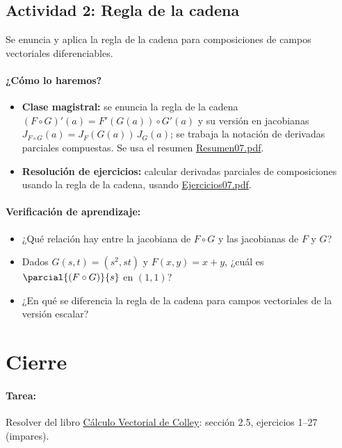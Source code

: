\documentclass[a4,11pt]{aleph-notas}
\begin{document}
\subsection*{Actividad 2: Regla de la cadena}
Se enuncia y aplica la regla de la cadena para composiciones de campos vectoriales diferenciables.

\paragraph{¿Cómo lo haremos?}
\begin{itemize}[leftmargin=*]
    \item \textbf{Clase magistral:} se enuncia la regla de la cadena $(F\circ G)'(a)=F'(G(a))\circ G'(a)$ y su versión en jacobianas $J_{F\circ G}(a)=J_F(G(a))\,J_G(a)$; se trabaja la notación de derivadas parciales compuestas. Se usa el resumen \href{https://andres-merino.github.io/MatematicaIII-05-N0051/01Resumen/Resumen07.pdf}{Resumen07.pdf}.
    \item \textbf{Resolución de ejercicios:} calcular derivadas parciales de composiciones usando la regla de la cadena, usando \href{https://andres-merino.github.io/MatematicaIII-05-N0051/04Ejercicios/Ejercicios07.pdf}{Ejercicios07.pdf}.
\end{itemize}

\paragraph{Verificación de aprendizaje:}
\begin{itemize}[leftmargin=*]
    \item ¿Qué relación hay entre la jacobiana de $F\circ G$ y las jacobianas de $F$ y $G$?
    \item Dados $G(s,t)=(s^2,st)$ y $F(x,y)=x+y$, ¿cuál es $\parcial{(F\circ G)}{s}$ en $(1,1)$?
    \item ¿En qué se diferencia la regla de la cadena para campos vectoriales de la versión escalar?
\end{itemize}

\section*{Cierre}

\paragraph{Tarea:}
Resolver del libro \href{https://catalogobiblioteca.puce.edu.ec/cgi-bin/koha/opac-detail.pl?biblionumber=83405&query_desc=su%3A%22An%C3%A1lisis%20vectorial%22}{Cálculo Vectorial de Colley}: sección 2.5, ejercicios 1--27 (impares).
\end{document}
